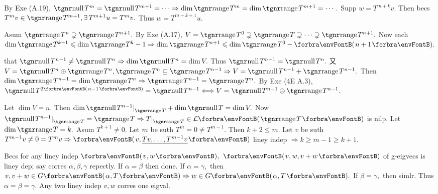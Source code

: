 By Exe (A.19), $\null T^m=\null T^{m+1}=\cdots\Rightarrow\dim\range T^m=\dim\range T^{m+1}=\cdots.$\PfEnd\parSol{}
\Or Supp $w=T^{m+k}v.$ Then becs $T^mv\in\range T^{m+1},\exists\,T^{m+1}u=T^mv.$ Thus $w=T^{m+k+1}u.$\PfEndB
\SepLine

Asum $\range T^{n}\supsetneq\range T^{n+1}.$ By Exe (A.17), $V=\range T^0\supsetneq\range T\supsetneq\cdots\supsetneq\range T^{n+1}.$\parSol{}
Now each $\dim\range T^{k+1}\leqslant\dim\range T^k-1\Rightarrow\dim\range T^{n+1}\leqslant\dim\range T^0-\Par{n+1}.$\PfEnd
\SepLine\pagebreak

\NOTICE that $\null T^{n-1}\neq\null T^n\Rightarrow\dim\null T^n=\dim V.$ Thus $\null T^{n-1}=\null T^n.$\parSol{}
又 $V=\null T^n\oplus\range T^n,\range T^n\subseteq\range T^{n-1}\Rightarrow V=\null T^{n-1}+\range T^{n-1}.$\PfEnd\parSol{}
\Or Then $\dim\range T^{n-1}=\dim\range T^n\Rightarrow\range T^{n-1}=\range T^n.$\PfEnd\vspace{2pt}\parSol{}
\Or By Exe (4E A.3), $\null T^{2\SmallPar{n-1}}=\null T^{n-1}\Longleftrightarrow V=\null T^{n-1}\oplus\range T^{n-1}.$\PfEnd
\SepLine

Let $\dim V=n.$ Then $\dim\null T^{n-1}\mmid_{\range T}+\dim\null T=\dim V.$\parSol{}
Now $\null T^{n-1}\mmid_{\range T}=\range T\Rightarrow T\mmid_{\range T}\in\Lm{\range T}$ is nilp.\PfEnd\vspace{4pt}\parSol{}
\Or Let $\dim\range T=k.$ Asum $T^{k+1}\neq 0.$ Let $m$ be suth $T^m=0\neq T^{m-1}.$ Then $k+2\leqslant m.$\parSol{}
Let $v$ be suth $T^{m-1}v\neq 0=T^mv\Rightarrow\Par{v,{}$\uline{$Tv,\dots,T^{m-1}v$}$}$ liney indep $\Rightarrow k\geqslant m-1\geqslant k+1.$\PfEndB
\SepLine

Becs for any liney indep $\Par{v,w},$ $\Par{v,w,v+w}$ of g-eigvecs is liney dep; say corres $\alpha,\beta,\gamma$ repectly.\parSol{}
If $\alpha=\beta$ then done. If $\alpha=\gamma,$ then $v,v+w\in G\Par{\alpha,T}\Rightarrow w\in G\Par{\alpha,T}.$ If $\beta=\gamma,$ then simlr.\parSol{}
Thus $\alpha=\beta=\gamma.$ Any two liney indep $v,w$ corres one eigval.\PfEndB
\SepLine

